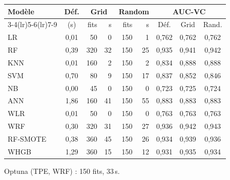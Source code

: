 \begin{tabular}{lcrrrrccc}
\toprule
Modèle & Déf. & \multicolumn{2}{c}{Grid} & \multicolumn{2}{c}{Random} & \multicolumn{3}{c}{AUC-VC} \\\cmidrule(lr){3-4}\cmidrule(lr){5-6}\cmidrule(lr){7-9}
 & (s) & fits & s & fits & s & Déf. & Grid & Rand. \\
\midrule
LR & 0,01 & 50 & 0 & 150 & 1 & 0,762 & 0,762 & 0,762 \\
RF & 0,39 & 320 & 32 & 150 & 25 & 0,935 & 0,941 & 0,942 \\
KNN & 0,01 & 160 & 2 & 150 & 2 & 0,834 & 0,888 & 0,888 \\
SVM & 0,70 & 80 & 9 & 150 & 17 & 0,837 & 0,852 & 0,846 \\
NB & 0,00 & 45 & 0 & 150 & 0 & 0,723 & 0,725 & 0,724 \\
ANN & 1,86 & 160 & 41 & 150 & 55 & 0,883 & 0,883 & 0,883 \\
WLR & 0,01 & 50 & 0 & 150 & 0 & 0,763 & 0,763 & 0,763 \\
WRF & 0,30 & 320 & 31 & 150 & 27 & 0,936 & 0,942 & 0,943 \\
RF-SMOTE & 0,38 & 360 & 45 & 150 & 26 & 0,934 & 0,939 & 0,936 \\
WHGB & 1,29 & 360 & 15 & 150 & 12 & 0,931 & 0,935 & 0,934 \\
\bottomrule
\end{tabular}

\smallskip\noindent\footnotesize Optuna (TPE, WRF) : 150 fits, 33\,s.